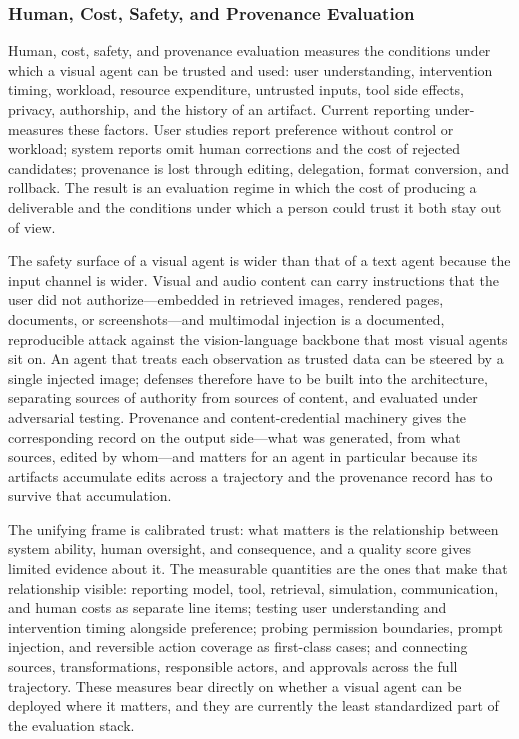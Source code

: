 \subsubsection{Human, Cost, Safety, and Provenance Evaluation}

Human, cost, safety, and provenance evaluation measures the conditions under which a visual agent can be trusted and used: user understanding, intervention timing, workload, resource expenditure, untrusted inputs, tool side effects, privacy, authorship, and the history of an artifact. Current reporting under-measures these factors. User studies report preference without control or workload; system reports omit human corrections and the cost of rejected candidates; provenance is lost through editing, delegation, format conversion, and rollback. The result is an evaluation regime in which the cost of producing a deliverable and the conditions under which a person could trust it both stay out of view.

The safety surface of a visual agent is wider than that of a text agent because the input channel is wider. Visual and audio content can carry instructions that the user did not authorize---embedded in retrieved images, rendered pages, documents, or screenshots---and multimodal injection is a documented, reproducible attack against the vision-language backbone that most visual agents sit on. An agent that treats each observation as trusted data can be steered by a single injected image; defenses therefore have to be built into the architecture, separating sources of authority from sources of content, and evaluated under adversarial testing. Provenance and content-credential machinery gives the corresponding record on the output side---what was generated, from what sources, edited by whom---and matters for an agent in particular because its artifacts accumulate edits across a trajectory and the provenance record has to survive that accumulation.

The unifying frame is calibrated trust: what matters is the relationship between system ability, human oversight, and consequence, and a quality score gives limited evidence about it. The measurable quantities are the ones that make that relationship visible: reporting model, tool, retrieval, simulation, communication, and human costs as separate line items; testing user understanding and intervention timing alongside preference; probing permission boundaries, prompt injection, and reversible action coverage as first-class cases; and connecting sources, transformations, responsible actors, and approvals across the full trajectory. These measures bear directly on whether a visual agent can be deployed where it matters, and they are currently the least standardized part of the evaluation stack.

